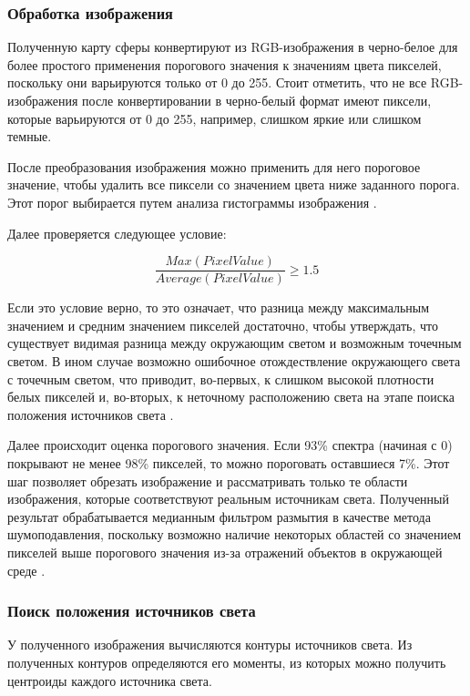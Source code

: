 \subsubsection*{Обработка изображения}

Полученную карту сферы конвертируют из RGB-изображения в черно-белое для более простого применения порогового значения к
значениям цвета пикселей, поскольку они варьируются только от 0 до 255. Стоит отметить, что не все RGB-изображения после конвертировании в черно-белый формат имеют пиксели, которые варьируются от 0 до 255, например, слишком яркие или слишком темные.

После преобразования изображения можно применить для него пороговое значение, чтобы удалить все пиксели со значением цвета ниже заданного порога. Этот порог выбирается путем анализа гистограммы изображения \cite{img_hists}.

Далее проверяется следующее условие:

\begin{equation}
	\frac{Max(PixelValue)}{Average(PixelValue)} \geq 1.5
\end{equation}

Если это условие верно, то это означает, что разница между максимальным значением и средним значением пикселей достаточно, чтобы утверждать, что существует видимая разница между окружающим светом и возможным точечным светом. В ином случае возможно ошибочное отождествление окружающего света с точечным светом, что приводит, во-первых, к слишком высокой плотности белых пикселей и, во-вторых, к неточному расположению света на этапе поиска положения источников света \cite{osti2019real}.

Далее происходит оценка порогового значения. Если 93\% спектра (начиная с 0) покрывают не менее 98\% пикселей, то можно пороговать оставшиеся 7\%. Этот шаг позволяет обрезать изображение и рассматривать только те области изображения, которые соответствуют реальным источникам света. Полученный результат обрабатывается медианным фильтром размытия в качестве метода шумоподавления, поскольку возможно наличие некоторых областей со значением пикселей выше порогового значения из-за отражений объектов в окружающей среде \cite{osti2019real}.

\subsubsection*{Поиск положения источников света}

У полученного изображения вычисляются контуры источников света. Из полученных контуров определяются его моменты, из которых можно получить центроиды каждого источника света.

